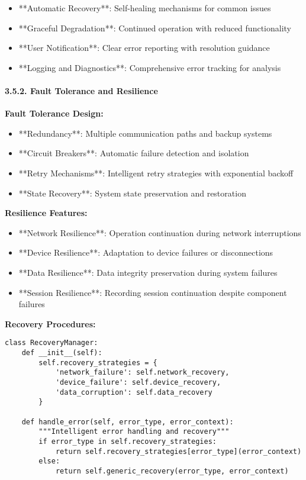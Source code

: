 \documentclass[12pt,a4paper]{article}
\begin{document}
\begin{itemize}
\item **Automatic Recovery**: Self-healing mechanisms for common issues
\item **Graceful Degradation**: Continued operation with reduced functionality
\item **User Notification**: Clear error reporting with resolution guidance
\item **Logging and Diagnostics**: Comprehensive error tracking for analysis

\end{itemize}
\paragraph{3.5.2. Fault Tolerance and Resilience}

\textbf{Fault Tolerance Design:}

\begin{itemize}
\item **Redundancy**: Multiple communication paths and backup systems
\item **Circuit Breakers**: Automatic failure detection and isolation
\item **Retry Mechanisms**: Intelligent retry strategies with exponential backoff
\item **State Recovery**: System state preservation and restoration

\end{itemize}
\textbf{Resilience Features:}

\begin{itemize}
\item **Network Resilience**: Operation continuation during network interruptions
\item **Device Resilience**: Adaptation to device failures or disconnections
\item **Data Resilience**: Data integrity preservation during system failures
\item **Session Resilience**: Recording session continuation despite component failures

\end{itemize}
\textbf{Recovery Procedures:}

\begin{verbatim}
class RecoveryManager:
    def __init__(self):
        self.recovery_strategies = {
            'network_failure': self.network_recovery,
            'device_failure': self.device_recovery,
            'data_corruption': self.data_recovery
        }
    
    def handle_error(self, error_type, error_context):
        """Intelligent error handling and recovery"""
        if error_type in self.recovery_strategies:
            return self.recovery_strategies[error_type](error_context)
        else:
            return self.generic_recovery(error_type, error_context)
\end{verbatim}
\end{document}
